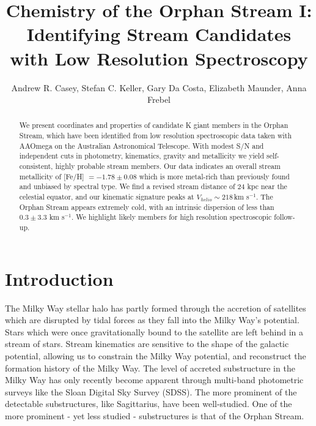 \documentclass{emulateapj}
\begin{document}
\title{Chemistry of the Orphan Stream I: Identifying Stream Candidates with Low Resolution Spectroscopy}

\author{Andrew R. Casey, Stefan C. Keller, Gary Da Costa, Elizabeth Maunder, Anna Frebel}

\begin{abstract}
We present coordinates and properties of candidate K giant members in the Orphan Stream, which have been identified from low resolution spectroscopic data taken with AAOmega on the Australian Astronomical Telescope. With modest S/N and independent cuts in photometry, kinematics, gravity and metallicity we yield self-consistent, highly probable stream members. Our data indicates an overall stream metallicity of [Fe/H] $= -1.78 \pm 0.08$ which is more metal-rich than previously found and unbiased by spectral type. We find a revised stream distance of 24 kpc near the celestial equator, and our kinematic signature peaks at $V_{helio} \sim 218$\,km s$^{-1}$. The Orphan Stream appears extremely cold, with an intrinsic dispersion of less than $0.3 \pm 3.3$ km s$^{-1}$. We highlight likely members for high resolution spectroscopic follow-up.
\end{abstract}


\section{Introduction}
\label{sec:introduction}

The Milky Way stellar halo has partly formed through the accretion of satellites which are disrupted by tidal forces as they fall into the Milky Way's potential. Stars which were once gravitationally bound to the satellite are left behind in a stream of stars. Stream kinematics are sensitive to the shape of the galactic potential, allowing us to constrain the Milky Way potential, and reconstruct the formation history of the Milky Way. The level of accreted substructure in the Milky Way has only recently become apparent through multi-band photometric surveys like the Sloan Digital Sky Survey (SDSS). The more prominent of the detectable substructures, like Sagittarius, have been well-studied. One of the more prominent \-- yet less studied \-- substructures is that of the Orphan Stream. 
\end{document}
